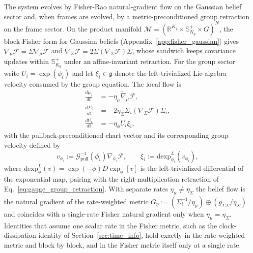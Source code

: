 \documentclass[11pt]{article}
\begin{document}
The system evolves by Fisher-Rao natural-gradient flow on the Gaussian belief sector and, when frames are evolved, by a metric-preconditioned group retraction on the frame sector. On the product manifold $\mathcal{M} = (\mathbb{R}^{K_q} \times \mathbb{S}^+_{K_q} \times G)^N$, the block-Fisher form for Gaussian beliefs (Appendix~\ref{app:fisher_gaussian}) gives $\tilde\nabla_\mu\mathcal{F} = \Sigma\nabla_\mu\mathcal{F}$ and $\tilde\nabla_\Sigma\mathcal{F} = 2\Sigma(\nabla_\Sigma\mathcal{F})\Sigma$, whose sandwich keeps covariance updates within $\mathbb{S}^+_{K_q}$ under an affine-invariant retraction. For the group sector write $U_i = \exp(\phi_i)$ and let $\xi_i \in \mathfrak{g}$ denote the left-trivialized Lie-algebra velocity consumed by the group equation. The local flow is
\begin{align}
\frac{d\mu_i}{dt} &= -\eta_\mu \tilde{\nabla}_\mu \mathcal{F}, \\
\frac{d\Sigma_i}{dt} &= -2\eta_\Sigma \Sigma_i (\nabla_\Sigma \mathcal{F}) \Sigma_i, \\
\frac{dU_i}{dt} &= -\eta_\phi U_i \xi_i,
\label{eq:gauge_natural_gradient}
\end{align}
with the pullback-preconditioned chart vector and its corresponding group velocity defined by
\begin{equation}
v_{\phi_i} := \mathcal{G}_{\mathrm{pull}}^{-1}(\phi_i) \nabla_{\phi_i} \mathcal{F},
\qquad
\xi_i := \mathrm{dexp}_{\phi_i}^{L}(v_{\phi_i}),
\label{eq:gauge_natural_gradient_def}
\end{equation}
where $\mathrm{dexp}_{\phi}^{L}(v) = \exp(-\phi)D\exp_{\phi}[v]$ is the left-trivialized differential of the exponential map, pairing with the right-multiplication retraction of Eq.~\eqref{eq:gauge_group_retraction}. With separate rates $\eta_\mu \neq \eta_\Sigma$ the belief flow is the natural gradient of the rate-weighted metric $G_\eta := (\Sigma_i^{-1}/\eta_\mu) \oplus (g_{\Sigma\Sigma}/\eta_\Sigma)$ and coincides with a single-rate Fisher natural gradient only when $\eta_\mu = \eta_\Sigma$. Identities that assume one scalar rate in the Fisher metric, such as the clock-dissipation identity of Section~\ref{sec:time_info}, hold exactly in the rate-weighted metric and block by block, and in the Fisher metric itself only at a single rate.
\end{document}
